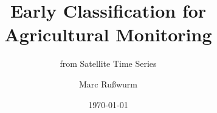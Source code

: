 \documentclass[%
  aspectratio=169,
  9pt,
  USenglish,
  titlegraphic, %
  affiliationintitlepagehead,
  progressbar,
]{beamer}
\title{Early Classification for Agricultural Monitoring}
\subtitle{from Satellite Time Series}
\author[M. Rußwurm]{Marc Rußwurm}
\institute[TUM]{Technical University of Munich, Germany\\
                Remote Sensing Technology}
\date{\today}
\begin{document}
\begin{frame}[t]
  \titlepage
\end{frame}
\end{document}
